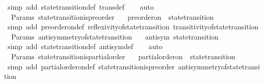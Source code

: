 \begin{isabellebody}
\ {\isacharparenleft}simp\ add{\isacharcolon}\ state{\isacharunderscore}transition{\isacharunderscore}def\ trans{\isacharunderscore}def{\isacharparenright}\isanewline
\ \ \isamarkupfalse%
\ auto%
\endisatagproof
{\isafoldproof}%
%
\isadelimproof
\isanewline
%
\endisadelimproof
\isanewline
{}\isamarkupfalse%
\ {\isacharparenleft}\ Params{\isacharparenright}\ state{\isacharunderscore}transition{\isacharunderscore}is{\isacharunderscore}preorder\ {\isacharcolon}\isanewline
\ \ {\isachardoublequoteopen}preorder{\isacharunderscore}on\ {\isasymSigma}\ state{\isacharunderscore}transition{\isachardoublequoteclose}\isanewline
%
\isadelimproof
\ \ %
\endisadelimproof
%
\isatagproof
{}\isamarkupfalse%
\ {\isacharparenleft}simp\ add{\isacharcolon}\ preorder{\isacharunderscore}on{\isacharunderscore}def\ reflexivity{\isacharunderscore}of{\isacharunderscore}state{\isacharunderscore}transition\ transitivity{\isacharunderscore}of{\isacharunderscore}state{\isacharunderscore}transition{\isacharparenright}%
\endisatagproof
{\isafoldproof}%
%
\isadelimproof
\isanewline
%
\endisadelimproof
\isanewline
{}\isamarkupfalse%
\ {\isacharparenleft}\ Params{\isacharparenright}\ antisymmetry{\isacharunderscore}of{\isacharunderscore}state{\isacharunderscore}transition\ {\isacharcolon}\isanewline
\ \ {\isachardoublequoteopen}antisym\ state{\isacharunderscore}transition{\isachardoublequoteclose}\ \ \isanewline
%
\isadelimproof
\ \ %
\endisadelimproof
%
\isatagproof
{}\isamarkupfalse%
\ {\isacharparenleft}simp\ add{\isacharcolon}\ state{\isacharunderscore}transition{\isacharunderscore}def\ antisym{\isacharunderscore}def{\isacharparenright}\isanewline
\ \ \isamarkupfalse%
\ auto%
\endisatagproof
{\isafoldproof}%
%
\isadelimproof
\isanewline
%
\endisadelimproof
\isanewline
{}\isamarkupfalse%
\ {\isacharparenleft}\ Params{\isacharparenright}\ state{\isacharunderscore}transition{\isacharunderscore}is{\isacharunderscore}partial{\isacharunderscore}order\ {\isacharcolon}\isanewline
\ \ {\isachardoublequoteopen}partial{\isacharunderscore}order{\isacharunderscore}on\ {\isasymSigma}\ state{\isacharunderscore}transition{\isachardoublequoteclose}\isanewline
%
\isadelimproof
\ \ %
\endisadelimproof
%
\isatagproof
{}\isamarkupfalse%
\ {\isacharparenleft}simp\ add{\isacharcolon}\ partial{\isacharunderscore}order{\isacharunderscore}on{\isacharunderscore}def\ state{\isacharunderscore}transition{\isacharunderscore}is{\isacharunderscore}preorder\ antisymmetry{\isacharunderscore}of{\isacharunderscore}state{\isacharunderscore}transition{\isacharparenright}%

\end{isabellebody}
